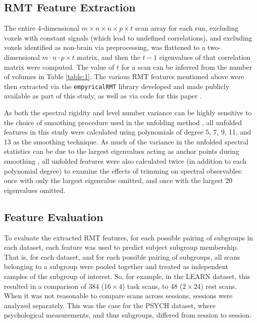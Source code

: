 \documentclass[NETN,manuscript]{stjour-new}
\begin{document}
\subsection{RMT Feature Extraction}
The entire 4-dimensional \(m \times n \times n \times p \times t\) scan array for each run,
excluding voxels with constant signals (which lead to undefined correlations), and excluding voxels
identified as non-brain via preprocessing, was flattened to a two-dimensional \(m \cdot n \cdot p
\times t\) matrix, and then the \(t - 1\) eigenvalues of that correlation matrix were computed. The
value of \(t\) for a scan can be inferred from the number of volumes in Table \ref{table:1}. The
various RMT features mentioned above were then extracted via the \texttt{empyricalRMT} library
\citep{bergerStfxecutablesEmpyricalRMTPreliminary2020} developed and made publicly available as part
of this study, as well as via code for this paper \citep{bergerderekm.DMBergerRandommatrixfmriV02020}.

As both the spectral rigidity and level number variance can be highly sensitive to the choice of
smoothing procedure used in the unfolding method
\citep{abul-magdUnfoldingSpectrumChaotic2014,moralesImprovedUnfoldingDetrending2011,abueleninSpectralUnfoldingChaotic2018,fossionRandommatrixSpectraTime2013,abueleninEffectUnfoldingSpectral2012},
all unfolded features in this study were calculated using polynomials of degree 5, 7, 9, 11, and 13
as the smoothing technique. As much of the variance in the unfolded spectral statistics can be due
to the largest eigenvalues acting as anchor points during smoothing
\citep{moralesImprovedUnfoldingDetrending2011,abueleninEffectUnfoldingSpectral2012}, all unfolded
features were also calculated twice (in addition to each polynomial degree) to examine the effects
of trimming on spectral observables: once with only the largest eigenvalue omitted, and once with
the largest 20 eigenvalues omitted.

\subsection{Feature Evaluation}
To evaluate the extracted RMT features, for each possible pairing of subgroups in each dataset, each
feature was used to predict subject subgroup membership. That is, for each dataset, and for each
possible pairing of subgroups, all scans belonging to a subgroup were pooled together and treated as
independent samples of the subgroup of interest. So, for example, in the LEARN dataset, this
resulted in a comparison of 384 (\(16 \times 4\)) task scans, to 48 (\(2 \times 24\)) rest scans. When it was not
reasonable to compare scans across sessions, sessions were analyzed separately. This was the case
for the PSYCH dataset, where psychological measurements, and thus subgroups, differed from session
to session.
\end{document}
